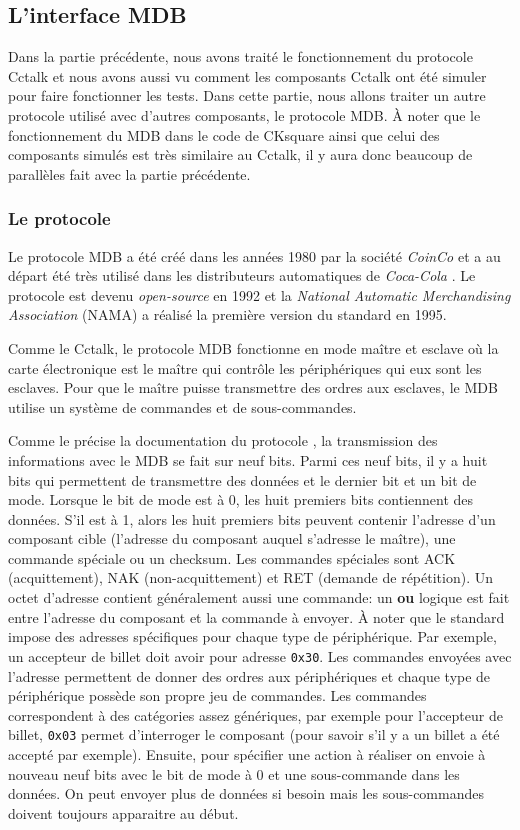 \documentclass[a4paper]{article}
\begin{document}
\subsection{L'interface MDB}%

Dans la partie précédente, nous avons traité le fonctionnement du protocole
Cctalk et nous avons aussi vu comment les composants Cctalk ont été simuler pour
faire fonctionner les tests. Dans cette partie, nous allons traiter un autre
protocole utilisé avec d'autres composants, le protocole MDB. À noter que le
fonctionnement du MDB dans le code de CKsquare ainsi que celui des composants
simulés est très similaire au Cctalk, il y aura donc beaucoup de parallèles fait
avec la partie précédente.

\subsubsection{Le protocole}

Le protocole MDB a été créé dans les années 1980 par la société \textit{CoinCo}
et a au départ été très utilisé dans les distributeurs automatiques de
\textit{Coca-Cola} \cite{enwiki:1094073752}. Le protocole est devenu
\textit{open-source} en 1992 et la \textit{National Automatic Merchandising
Association} (NAMA) a réalisé la première version du standard en 1995.

Comme le Cctalk, le protocole MDB fonctionne en mode maître et esclave où la
carte électronique est le maître qui contrôle les périphériques qui eux sont les
esclaves. Pour que le maître puisse transmettre des ordres aux esclaves, le MDB
utilise un système de commandes et de sous-commandes.

Comme le précise la documentation du protocole \cite{mdbdoc}, la transmission
des informations avec le MDB se fait sur neuf bits. Parmi ces neuf bits, il y a
huit bits qui permettent de transmettre des données et le dernier bit et un bit
de mode. Lorsque le bit de mode est à 0, les huit premiers bits contiennent des
données. S'il est à 1, alors les huit premiers bits peuvent contenir l'adresse
d'un composant cible (l'adresse du composant auquel s'adresse le maître), une
commande spéciale ou un checksum. Les commandes spéciales sont ACK
(acquittement), NAK (non-acquittement) et RET (demande de répétition). Un octet
d'adresse contient généralement aussi une commande: un \textbf{ou} logique est
fait entre l'adresse du composant et la commande à envoyer. À noter que le
standard impose des adresses spécifiques pour chaque type de périphérique. Par
exemple, un accepteur de billet doit avoir pour adresse \verb|0x30|. Les
commandes envoyées avec l'adresse permettent de donner des ordres aux
périphériques et chaque type de périphérique possède son propre jeu de
commandes. Les commandes correspondent à des catégories assez génériques, par
exemple pour l'accepteur de billet, \verb|0x03| permet d'interroger le composant
(pour savoir s'il y a un billet a été accepté par exemple). Ensuite, pour
spécifier une action à réaliser on envoie à nouveau neuf bits avec le bit de mode
à 0 et une sous-commande dans les données. On peut envoyer plus de données si
besoin mais les sous-commandes doivent toujours apparaitre au début.
\end{document}

